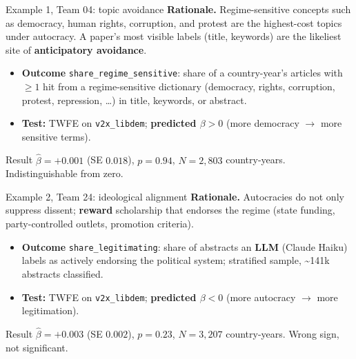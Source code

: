 \documentclass[aspectratio=169,11pt]{beamer}
\newcommand{\key}[1]{\textcolor{agentblue}{\textbf{#1}}}
\newcommand{\warn}[1]{\textcolor{gateamber}{#1}}
\begin{document}
\begin{frame}{Example 1, Team 04: topic avoidance}
  \small
  \textbf{Rationale.} Regime-sensitive concepts such as democracy, human rights,
  corruption, and protest are the highest-cost topics under autocracy. A paper's
  most visible labels (title, keywords) are the likeliest site of
  \key{anticipatory avoidance}.
  \vspace{0.4em}
  \begin{itemize}
    \item \textbf{Outcome} \texttt{share\_regime\_sensitive}: share of a
          country-year's articles with $\geq 1$ hit from a regime-sensitive
          dictionary (democracy, rights, corruption, protest, repression, \dots)
          in title, keywords, or abstract.
    \item \textbf{Test:} TWFE on \texttt{v2x\_libdem}; \key{predicted $\beta>0$}
          (more democracy $\rightarrow$ more sensitive terms).
  \end{itemize}
  \vspace{0.3em}
  \begin{block}{Result}
    $\hat\beta = +0.001$ (SE $0.018$), $p = 0.94$, $N = 2{,}803$ country-years.
    \hfill\warn{Indistinguishable from zero.}
  \end{block}
\end{frame}

\begin{frame}{Example 2, Team 24: ideological alignment}
  \small
  \textbf{Rationale.} Autocracies do not only suppress dissent; \key{reward}
  scholarship that endorses the regime (state funding, party-controlled outlets,
  promotion criteria). 
  \vspace{0.4em}
  \begin{itemize}
    \item \textbf{Outcome} \texttt{share\_legitimating}: share of abstracts an
          \key{LLM} (Claude Haiku) labels as actively endorsing the political
          system; stratified sample, \textasciitilde141k abstracts classified.
    \item \textbf{Test:} TWFE on \texttt{v2x\_libdem}; \key{predicted $\beta<0$}
          (more autocracy $\rightarrow$ more legitimation).
  \end{itemize}
  \vspace{0.3em}
  \begin{block}{Result}
    $\hat\beta = +0.003$ (SE $0.002$), $p = 0.23$, $N = 3{,}207$ country-years.
    \hfill\warn{Wrong sign, not significant.}
  \end{block}
  \vspace{0.1em}
\end{frame}
\end{document}
